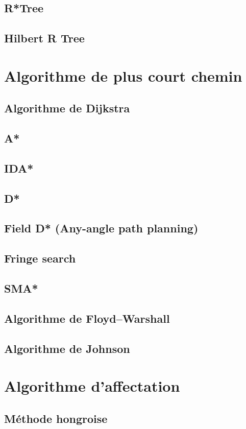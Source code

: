 \subsection{R*Tree}
\subsection{Hilbert R Tree}

%
\section{Algorithme de plus court chemin}
\subsection{Algorithme de Dijkstra}
\subsection{A*}
\subsection{IDA*}
\subsection{D*}
\subsection{Field D* (Any-angle path planning)}
\subsection{Fringe search}
\subsection{SMA*}
\subsection{Algorithme de Floyd–Warshall}
\subsection{Algorithme de Johnson}

%
\section{Algorithme d'affectation}
\subsection{Méthode hongroise}
